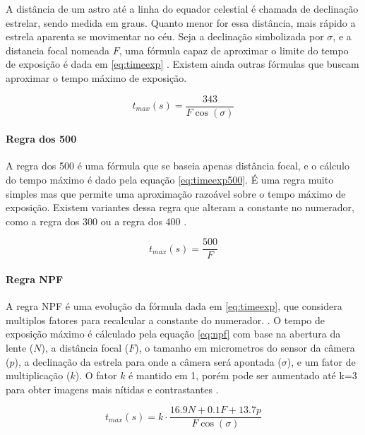 A distância de um astro até a linha do equador celestial é chamada de declinação estrelar, sendo medida em graus. Quanto menor for essa distância, mais rápido a estrela aparenta se movimentar no céu. Seja a declinação simbolizada por $\sigma$, e a distancia focal nomeada $ F $, uma fórmula capaz de aproximar o limite do tempo de exposição é dada em \ref{eq:timeexp} \cite{book:astrophotographyAmateur}. Existem ainda outras fórmulas que buscam aproximar o tempo máximo de exposição. 

\begin{equation}
	t_{max}(s) = \dfrac{343}{F\cos(\sigma)}
	\label{eq:timeexp}
\end{equation}



\paragraph{Regra dos 500}

A regra dos 500 é uma fórmula que se baseia apenas distância focal, e o cálculo do tempo máximo é dado pela equação \ref{eq:timeexp500}. É uma regra muito simples mas que permite uma aproximação razoável sobre o tempo máximo de exposição. Existem variantes dessa regra que alteram a constante no numerador, como a regra dos 300 ou a regra dos 400 \cite{site:500xNPF}.

\begin{equation}
	t_{max}(s) = \dfrac{500}{F}
	\label{eq:timeexp500}
\end{equation}

\paragraph{Regra NPF}

A regra NPF é uma evolução da fórmula dada em \ref{eq:timeexp}, que considera multiplos fatores para recalcular a constante do numerador.
\cite{site:500xNPF}. O tempo de exposição máximo é cálculado pela equação \ref{eq:npf} com base na abertura da lente ($ N $), a distância focal ($ F $), o tamanho em micrometros do sensor da câmera ($ p $), a declinação da estrela para onde a câmera será apontada ($\sigma$), e um fator de multiplicação ($ k $). O fator $ k $ é mantido em 1, porém pode ser aumentado até k=3 para obter imagens mais nítidas e contrastantes \cite{site:500xNPF}. 

\begin{equation}
	t_{max}(s) = k \cdot \dfrac{16.9 N  + 0.1 F + 13.7 p}{F\cos(\sigma)}
	\label{eq:npf}
\end{equation}

